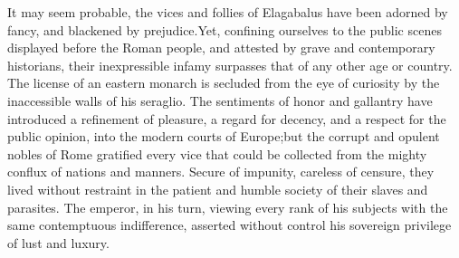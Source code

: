 
It may seem probable, the vices and follies of Elagabalus have
been adorned by fancy, and blackened by prejudice.\footnotemark[60] Yet,
confining ourselves to the public scenes displayed before the
Roman people, and attested by grave and contemporary historians,
their inexpressible infamy surpasses that of any other age or
country. The license of an eastern monarch is secluded from the
eye of curiosity by the inaccessible walls of his seraglio. The
sentiments of honor and gallantry have introduced a refinement of
pleasure, a regard for decency, and a respect for the public
opinion, into the modern courts of Europe;\footnotemark[601] but the corrupt
and opulent nobles of Rome gratified every vice that could be
collected from the mighty conflux of nations and manners. Secure
of impunity, careless of censure, they lived without restraint in
the patient and humble society of their slaves and parasites. The
emperor, in his turn, viewing every rank of his subjects with the
same contemptuous indifference, asserted without control his
sovereign privilege of lust and luxury.



